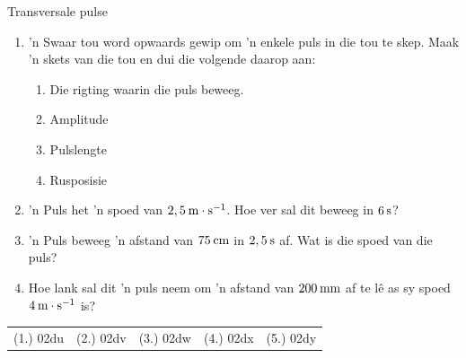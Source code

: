 \begin{eocexercises}{Transversale pulse}
            \nopagebreak
      \label{m38802*id316647}\begin{enumerate}[noitemsep, label=\textbf{\arabic*}. ] 
            \label{m38802*uid66}\item 'n Swaar tou word opwaards gewip om 'n enkele puls in die tou te skep. Maak 'n skets van die tou en dui die volgende daarop aan:
\label{m38802*id316663}\begin{enumerate}[noitemsep, label=\textbf{\alph*}. ] 
\item Die rigting waarin die puls beweeg.
\item Amplitude
\item Pulslengte
\item Rusposisie
\end{enumerate}

\item 'n Puls het 'n spoed van $2,5\phantom{\rule{2pt}{0ex}}\text{m}\ensuremath{\cdot}\text{s}{}^{-1}$. Hoe ver sal dit beweeg in $6\phantom{\rule{2pt}{0ex}}\text{s}$?\newline
\item 'n Puls beweeg 'n afstand van $75\phantom{\rule{2pt}{0ex}}\text{cm}$ in $2,5\phantom{\rule{2pt}{0ex}}\text{s}$ af. Wat is die spoed van die puls?\newline
\item Hoe lank sal dit 'n puls neem om 'n afstand van $200\phantom{\rule{2pt}{0ex}}\text{mm}$ af te l\^{e} as sy spoed $4\phantom{\rule{2pt}{0ex}}\text{m}\ensuremath{\cdot}\text{s}{}^{-1}$ is?\newline

\end{enumerate}
  \label{m38802**end}
  \label{21d48a6f8839b4b265192acd9ea3d978**end}
\practiceinfo
 \par \begin{tabular}[h]{ccccc}
 (1.) 02du  &  (2.) 02dv  &  (3.) 02dw  &  (4.) 02dx  &  (5.) 02dy  \end{tabular}
\end{eocexercises}
